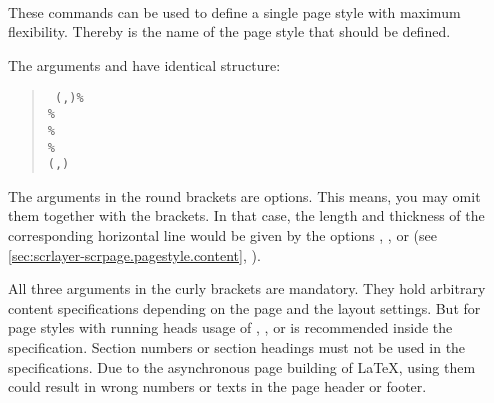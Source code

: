 \begin{Declaration}
  \\
  \\
  \\
\end{Declaration}
%
%
%
%
These commands can be used to define a single page style with maximum
flexibility. Thereby  is the name of the page style that should
be defined.

The arguments  and  have
identical structure:
\begin{quote}\raggedright
  \texttt{%
    (,)\%\\
    \%\\
    \%\\
    \%\\
    (,)%
  }
\end{quote}
The arguments in the round brackets are options. This means, you may
omit them together with the brackets. In that case, the length and thickness
of the corresponding horizontal line would be given by the \KOMAScript{}
options , ,  or
 (see \autoref{sec:scrlayer-scrpage.pagestyle.content},
).

All three arguments in the curly brackets are mandatory. They hold arbitrary
content specifications depending on the page and the layout settings. But for
page styles with running heads usage of , , or
 is recommended inside the specification. Section numbers or
section headings must not be used in the specifications. Due to the
asynchronous page building of \LaTeX, using them could result in wrong numbers
or texts in the page header or footer.

